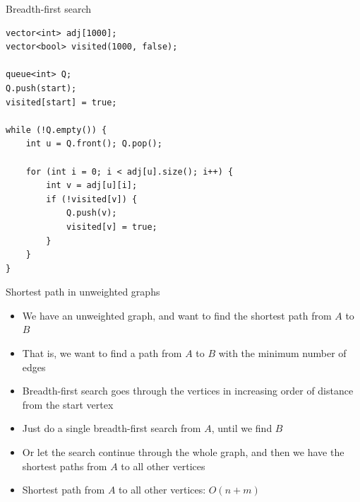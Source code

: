 \documentclass{beamer}
\begin{document}

\begin{frame}{Breadth-first search}
    \begin{verbatim}
vector<int> adj[1000];
vector<bool> visited(1000, false);

queue<int> Q;
Q.push(start);
visited[start] = true;

while (!Q.empty()) {
    int u = Q.front(); Q.pop();

    for (int i = 0; i < adj[u].size(); i++) {
        int v = adj[u][i];
        if (!visited[v]) {
            Q.push(v);
            visited[v] = true;
        }
    }
}
    \end{verbatim}
\end{frame}

\begin{frame}[plain]{Shortest path in unweighted graphs}
    \vspace{5pt}
    \begin{itemize}
        \item We have an unweighted graph, and want to find the shortest path from $A$ to $B$
        \item That is, we want to find a path from $A$ to $B$ with the minimum number of edges
        \vspace{10pt}
        \item Breadth-first search goes through the vertices in increasing order of distance from the start vertex
        \item Just do a single breadth-first search from $A$, until we find $B$
        \vspace{5pt}
        \item Or let the search continue through the whole graph, and then we have the shortest paths from $A$ to all other vertices
        \item Shortest path from $A$ to all other vertices: $O(n + m)$
    \end{itemize}
\end{frame}
\end{document}
